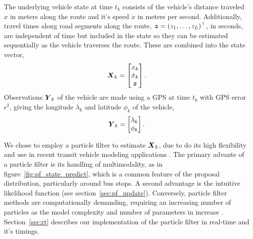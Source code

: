 The underlying vehicle state at time $t_k$ consists of
the vehicle's distance traveled $x$ in meters along the route and
it's speed $\dot x$ in meters per second.
Additionally, travel times along road segments along the route, 
$\boldsymbol{z} = (z_1,\ldots,z_L)^\top$, in seconds,
are independent of time but included in the state so they can be estimated
sequentially as the vehicle traverses the route.
These are combined into the state vector,
\begin{equation}
\label{eq:vehicle_state}
\mbox{$\boldsymbol{X}$}_k = 
\begin{bmatrix}
    x_k \\ \dot x_k \\ \boldsymbol{z}
\end{bmatrix}.
\end{equation}
Observations $\mbox{$\boldsymbol{Y}$}_k$ of the vehicle are made using a GPS at time $t_k$
with GPS error $\epsilon^2$,
giving the longitude $\lambda_k$ and latitude $\phi_k$ of the vehicle,
\begin{equation}
\label{eq:vehicle_obs}
\mbox{$\boldsymbol{Y}$}_k = \begin{bmatrix} \lambda_k \\ \phi_k \end{bmatrix}.
\end{equation}


We chose to employ a particle filter to estimate $\mbox{$\boldsymbol{X}$}_k$,
due to do its high flexibility and use in recent 
transit vehicle modeling applications \citep{Hans_2015}.
The primary advante of a particle filter is its handling of multimodality,
as in figure~\ref{fig:pf_state_predict},
which is a common feature of the proposal distribution, particularly around bus stops.
A second advantage is the intuitive likelihood function (see section~\ref{sec:pf_update}).
Conversely, particle filter methods are computationally demanding,
requiring an increasing number of particles as the model complexity and
number of parameters in increase \citep{}.
Section~\ref{sec:rt} describes our implementation of the particle filter in real-time 
and it's timings.




